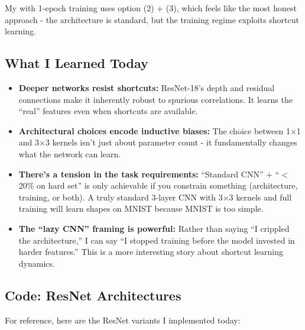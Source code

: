 \documentclass[9pt,a4paper,twocolumn,twoside]{tau-class/tau}
\begin{document}
        My  with 1-epoch training uses option (2) + (3), which feels like the most honest approach - the architecture is standard, but the training regime exploits shortcut learning.

    \subsection{What I Learned Today}

        \begin{itemize}
            \item \textbf{Deeper networks resist shortcuts:} ResNet-18's depth and residual connections make it inherently robust to spurious correlations. It learns the ``real'' features even when shortcuts are available.

            \item \textbf{Architectural choices encode inductive biases:} The choice between 1$\times$1 and 3$\times$3 kernels isn't just about parameter count - it fundamentally changes what the network can learn.

            \item \textbf{There's a tension in the task requirements:} ``Standard CNN'' + ``$<$20\% on hard set'' is only achievable if you constrain something (architecture, training, or both). A truly standard 3-layer CNN with 3$\times$3 kernels and full training will learn shapes on MNIST because MNIST is too simple.

            \item \textbf{The ``lazy CNN'' framing is powerful:} Rather than saying ``I crippled the architecture,'' I can say ``I stopped training before the model invested in harder features.'' This is a more interesting story about shortcut learning dynamics.
        \end{itemize}

    \subsection{Code: ResNet Architectures}

        For reference, here are the ResNet variants I implemented today:
\end{document}
